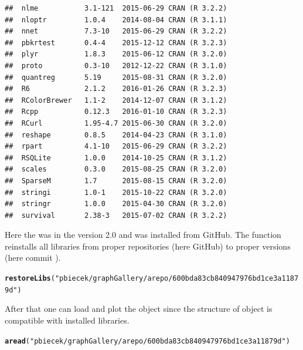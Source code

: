 \documentclass[nojss]{jss}\usepackage[]{graphicx}\usepackage[]{color}
\makeatletter
\newcommand{\hlstr}[1]{\textcolor[rgb]{0.192,0.494,0.8}{#1}}%
\newcommand{\hlstd}[1]{\textcolor[rgb]{0.345,0.345,0.345}{#1}}%
\newcommand{\hlkwd}[1]{\textcolor[rgb]{0.737,0.353,0.396}{\textbf{#1}}}%
\newenvironment{kframe}{%
 \def\at@end@of@kframe{}%
 \ifinner\ifhmode%
  \def\at@end@of@kframe{\end{minipage}}%
  \begin{minipage}{\columnwidth}%
 \fi\fi%
 \def\FrameCommand##1{\hskip\@totalleftmargin \hskip-\fboxsep
 \colorbox{shadecolor}{##1}\hskip-\fboxsep
     \hskip-\linewidth \hskip-\@totalleftmargin \hskip\columnwidth}%
 \MakeFramed {\advance\hsize-\width
   \@totalleftmargin\z@ \linewidth\hsize
   \@setminipage}}%
 {\par\unskip\endMakeFramed%
 \at@end@of@kframe}
\newenvironment{knitrout}{}{} %
\makeatother
\begin{document}
\begin{knitrout}
\begin{kframe}
\begin{verbatim}
##  nlme           3.1-121  2015-06-29 CRAN (R 3.2.2)                 
##  nloptr         1.0.4    2014-08-04 CRAN (R 3.1.1)                 
##  nnet           7.3-10   2015-06-29 CRAN (R 3.2.2)                 
##  pbkrtest       0.4-4    2015-12-12 CRAN (R 3.2.3)                 
##  plyr           1.8.3    2015-06-12 CRAN (R 3.2.0)                 
##  proto          0.3-10   2012-12-22 CRAN (R 3.1.0)                 
##  quantreg       5.19     2015-08-31 CRAN (R 3.2.0)                 
##  R6             2.1.2    2016-01-26 CRAN (R 3.2.3)                 
##  RColorBrewer   1.1-2    2014-12-07 CRAN (R 3.1.2)                 
##  Rcpp           0.12.3   2016-01-10 CRAN (R 3.2.3)                 
##  RCurl          1.95-4.7 2015-06-30 CRAN (R 3.2.0)                 
##  reshape        0.8.5    2014-04-23 CRAN (R 3.1.0)                 
##  rpart          4.1-10   2015-06-29 CRAN (R 3.2.2)                 
##  RSQLite        1.0.0    2014-10-25 CRAN (R 3.1.2)                 
##  scales         0.3.0    2015-08-25 CRAN (R 3.2.0)                 
##  SparseM        1.7      2015-08-15 CRAN (R 3.2.0)                 
##  stringi        1.0-1    2015-10-22 CRAN (R 3.2.0)                 
##  stringr        1.0.0    2015-04-30 CRAN (R 3.2.0)                 
##  survival       2.38-3   2015-07-02 CRAN (R 3.2.2)
\end{verbatim}
\end{kframe}
\end{knitrout}


Here the  was in the version 2.0 and was installed from GitHub. The  function reinstalls all libraries from proper repositories (here GitHub) to proper versions (here commit ).

\begin{knitrout}
\color{fgcolor}\begin{kframe}
\begin{alltt}
\hlkwd{restoreLibs}\hlstd{(}\hlstr{"pbiecek/graphGallery/arepo/600bda83cb840947976bd1ce3a11879d"}\hlstd{)}
\end{alltt}
\end{kframe}
\end{knitrout}


After that one can load and plot the  object since the structure of  object is compatible with installed libraries.

\begin{knitrout}
\color{fgcolor}\begin{kframe}
\begin{alltt}
\hlkwd{aread}\hlstd{(}\hlstr{"pbiecek/graphGallery/arepo/600bda83cb840947976bd1ce3a11879d"}\hlstd{)}
\end{alltt}
\end{kframe}
\end{knitrout}
\end{document}

